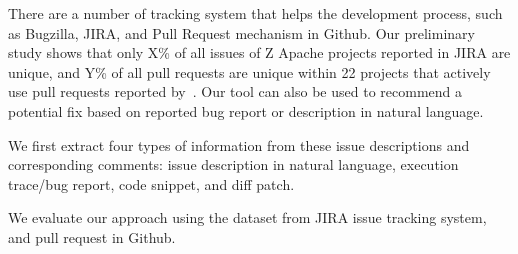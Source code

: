 


There are a number of tracking system that helps the development process, such as Bugzilla, JIRA, and Pull Request mechanism in Github. Our preliminary study shows that only X\% of all issues of Z Apache projects reported in JIRA are unique, and Y\% of all pull requests are unique within 22 projects that actively use pull requests reported by~\cite{Devanbu:PullMSR15}. Our tool can also be used to recommend a potential fix based on reported bug report or description in natural language. 

We first extract four types of information from these issue descriptions and corresponding comments: issue description in natural language, execution trace/bug report, code snippet, and diff patch. 

We evaluate our approach using the dataset from JIRA issue tracking system, and pull request in Github. 



